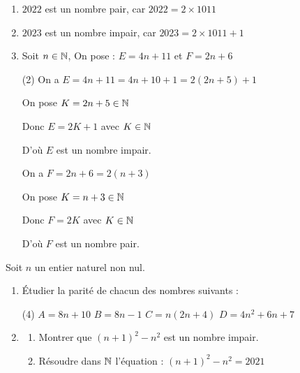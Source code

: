 \documentclass[10pt, a4paper]{article}
\begin{document}
\begin{Exemple}[][5 min]
\begin{enumerate}[leftmargin=*,itemsep=0.5pt]
    \item $2022$ est un nombre pair, car $2022 = 2 \times 1011$
    \item $2023$ est un nombre impair, car $2023 = 2 \times 1011 + 1$
    \item Soit $n \in \mathbb{N}$, 
    On pose : $E = 4n + 11$ et $F = 2n + 6$
\begin{tasks}[label=$\bullet$, label-width=8pt, item-indent=15pt](2)
    \task On a $E = 4n + 11 = 4n + 10 + 1 = 2(2n + 5) + 1$

On pose $K = 2n + 5 \in \mathbb{N}$

Donc $E = 2K + 1$ avec $K \in \mathbb{N}$

 D'où $E$ est un nombre impair.
    
    \task On a $F = 2n + 6 = 2(n + 3)$
    
    On pose $K = n + 3 \in \mathbb{N}$
    
    Donc $F = 2K$ avec $K \in \mathbb{N}$
    
    D'où $F$ est un nombre pair.
\end{tasks}
\end{enumerate}
\end{Exemple}


\begin{Application}[][15 min]
Soit $n$ un entier naturel non nul. 
\begin{enumerate}[leftmargin=*,itemsep=0.5pt]
    \item Étudier la parité de chacun des nombres suivants :
\begin{tasks}[label=$\bullet$, label-width=12pt, item-indent=15pt](4)
    \task $A=8n+10$
    \task $B=8n-1$
    \task $C=n(2n+4)$
    \task $D=4n^2+6n+7$
\end{tasks}
    \item 
    \begin{enumerate}[leftmargin=*,itemsep=0.5pt]
        \item Montrer que $(n + 1)^2 - n^2$ est un nombre impair.
        \item Résoudre dans $\mathbb{N}$ l'équation : $(n + 1)^2 - n^2 = 2021$
    \end{enumerate}
\end{enumerate}
\end{Application}
\end{document}
